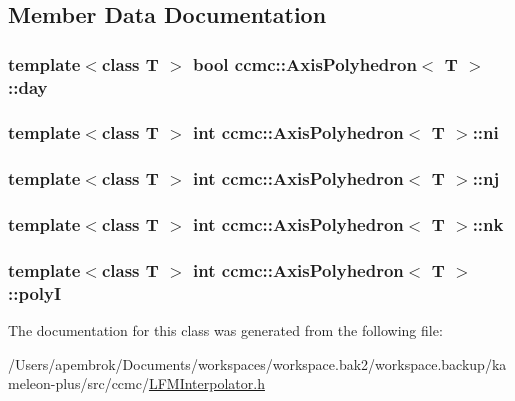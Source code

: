 \subsection{Member Data Documentation}
\hypertarget{classccmc_1_1_axis_polyhedron_a1f981cc1441ff15a0e5a80f666b3bcbb}{
\subsubsection[{day}]{\setlength{\rightskip}{0pt plus 5cm}template$<$class T $>$ bool {\bf ccmc\-::\-Axis\-Polyhedron}$<$ T $>$\-::day}}\label{classccmc_1_1_axis_polyhedron_a1f981cc1441ff15a0e5a80f666b3bcbb}
\hypertarget{classccmc_1_1_axis_polyhedron_ac3160e03e3b37a3ca3eb2022662f7bd2}{
\subsubsection[{ni}]{\setlength{\rightskip}{0pt plus 5cm}template$<$class T $>$ int {\bf ccmc\-::\-Axis\-Polyhedron}$<$ T $>$\-::ni}}\label{classccmc_1_1_axis_polyhedron_ac3160e03e3b37a3ca3eb2022662f7bd2}
\hypertarget{classccmc_1_1_axis_polyhedron_a62de873c6e6bd244a75fe64a2538f501}{
\subsubsection[{nj}]{\setlength{\rightskip}{0pt plus 5cm}template$<$class T $>$ int {\bf ccmc\-::\-Axis\-Polyhedron}$<$ T $>$\-::nj}}\label{classccmc_1_1_axis_polyhedron_a62de873c6e6bd244a75fe64a2538f501}
\hypertarget{classccmc_1_1_axis_polyhedron_a9fb6852015288390760e0e231daef379}{
\subsubsection[{nk}]{\setlength{\rightskip}{0pt plus 5cm}template$<$class T $>$ int {\bf ccmc\-::\-Axis\-Polyhedron}$<$ T $>$\-::nk}}\label{classccmc_1_1_axis_polyhedron_a9fb6852015288390760e0e231daef379}
\hypertarget{classccmc_1_1_axis_polyhedron_a86bf3b4fab1d62d902ecbc97b1ff2b7f}{
\subsubsection[{poly\-I}]{\setlength{\rightskip}{0pt plus 5cm}template$<$class T $>$ int {\bf ccmc\-::\-Axis\-Polyhedron}$<$ T $>$\-::poly\-I}}\label{classccmc_1_1_axis_polyhedron_a86bf3b4fab1d62d902ecbc97b1ff2b7f}


The documentation for this class was generated from the following file\-:\begin{DoxyCompactItemize}
\item 
/\-Users/apembrok/\-Documents/workspaces/workspace.\-bak2/workspace.\-backup/kameleon-\/plus/src/ccmc/\hyperlink{_l_f_m_interpolator_8h}{L\-F\-M\-Interpolator.\-h}\end{DoxyCompactItemize}
